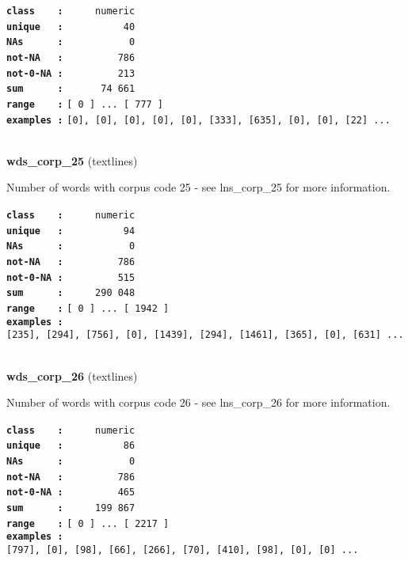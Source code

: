 \documentclass[]{article}
\begin{document}
\textbf{\texttt{class\ \ \ \ :}} \texttt{~~~~~numeric}\\
\textbf{\texttt{unique\ \ \ :}} \texttt{~~~~~~~~~~40}\\
\textbf{\texttt{NAs\ \ \ \ \ \ :}} \texttt{~~~~~~~~~~~0}\\
\textbf{\texttt{not-NA\ \ \ :}} \texttt{~~~~~~~~~786}\\
\textbf{\texttt{not-0-NA\ :}} \texttt{~~~~~~~~~213}\\
\textbf{\texttt{sum\ \ \ \ \ \ :}} \texttt{~~~~~~74~661}\\
\textbf{\texttt{range\ \ \ \ :}}
\texttt{{[}\ 0\ {]}\ ...\ {[}\ 777\ {]}}\\
\textbf{\texttt{examples\ :}}
\texttt{{[}0{]},\ {[}0{]},\ {[}0{]},\ {[}0{]},\ {[}0{]},\ {[}333{]},\ {[}635{]},\ {[}0{]},\ {[}0{]},\ {[}22{]}\ ...}\\

~

\textbf{wds\_corp\_25} (textlines)

Number of words with corpus code 25 - see lns\_corp\_25 for more
information.

\textbf{\texttt{class\ \ \ \ :}} \texttt{~~~~~numeric}\\
\textbf{\texttt{unique\ \ \ :}} \texttt{~~~~~~~~~~94}\\
\textbf{\texttt{NAs\ \ \ \ \ \ :}} \texttt{~~~~~~~~~~~0}\\
\textbf{\texttt{not-NA\ \ \ :}} \texttt{~~~~~~~~~786}\\
\textbf{\texttt{not-0-NA\ :}} \texttt{~~~~~~~~~515}\\
\textbf{\texttt{sum\ \ \ \ \ \ :}} \texttt{~~~~~290~048}\\
\textbf{\texttt{range\ \ \ \ :}}
\texttt{{[}\ 0\ {]}\ ...\ {[}\ 1942\ {]}}\\
\textbf{\texttt{examples\ :}}
\texttt{{[}235{]},\ {[}294{]},\ {[}756{]},\ {[}0{]},\ {[}1439{]},\ {[}294{]},\ {[}1461{]},\ {[}365{]},\ {[}0{]},\ {[}631{]}\ ...}\\

~

\textbf{wds\_corp\_26} (textlines)

Number of words with corpus code 26 - see lns\_corp\_26 for more
information.

\textbf{\texttt{class\ \ \ \ :}} \texttt{~~~~~numeric}\\
\textbf{\texttt{unique\ \ \ :}} \texttt{~~~~~~~~~~86}\\
\textbf{\texttt{NAs\ \ \ \ \ \ :}} \texttt{~~~~~~~~~~~0}\\
\textbf{\texttt{not-NA\ \ \ :}} \texttt{~~~~~~~~~786}\\
\textbf{\texttt{not-0-NA\ :}} \texttt{~~~~~~~~~465}\\
\textbf{\texttt{sum\ \ \ \ \ \ :}} \texttt{~~~~~199~867}\\
\textbf{\texttt{range\ \ \ \ :}}
\texttt{{[}\ 0\ {]}\ ...\ {[}\ 2217\ {]}}\\
\textbf{\texttt{examples\ :}}
\texttt{{[}797{]},\ {[}0{]},\ {[}98{]},\ {[}66{]},\ {[}266{]},\ {[}70{]},\ {[}410{]},\ {[}98{]},\ {[}0{]},\ {[}0{]}\ ...}\\
\end{document}
